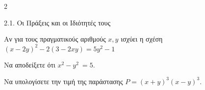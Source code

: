 \begin{ylh}{2}
    \item 2.1. Οι Πράξεις και οι Ιδιότητές τους
\end{ylh}
Αν για τους πραγματικούς αριθμούς $x,y$ ισχύει η σχέση
$(x-2y)^{2}-2(3-2xy) = 5y^{2}-1$
\begin{alist}
\item Να αποδείξετε ότι $x^{2}-y^{2}\  = 5$.
\item Να υπολογίσετε την τιμή της παράστασης $P = (x + y)^{3}(x-y)^{3}$.
\end{alist}

